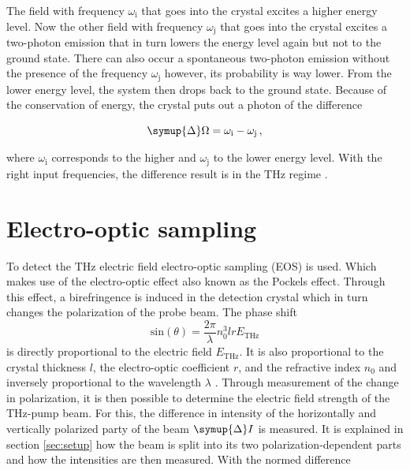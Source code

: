 The field with frequency $\omega_\text{i}$ that goes into the crystal excites a higher energy level.
Now the other field  with frequency $\omega_\text{j}$ that goes into the crystal excites a two-photon emission that in turn lowers the energy level again but not to the ground state.
There can also occur a spontaneous two-photon emission without the presence of the frequency $\omega_\text{j}$ however, its probability is way lower.
From the lower energy level, the system then drops back to the ground state.
Because of the conservation of energy, the crystal puts out a photon of the difference

\begin{equation}
    \symup{\Delta}\Omega = \omega_\text{i} - \omega_\text{j} \, ,
\end{equation}

where $\omega_\text{i}$ corresponds to the higher and $\omega_\text{j}$ to the lower energy level.
With the right input frequencies, the difference result is in the $\si{\tera\hertz}$ regime \cite{boyd2020nonlinear}.



\section{Electro-optic sampling}\label{sec:eos}
To detect the $\si{\tera\hertz}$ electric field electro-optic sampling (EOS) is used.
Which makes use of the electro-optic effect also known as the Pockels effect.
Through this effect, a birefringence is induced in the detection crystal which in turn changes the polarization of the probe beam.
The phase shift 
\begin{equation}
    \text{sin}(\theta) = \frac{2\pi}{\lambda} n_0^3 l r E_\text{THz}
\end{equation}
is directly proportional to the electric field $E_\text{THz}$. 
It is also proportional to the crystal thickness $l$, the electro-optic coefficient $r$, and the refractive index $n_0$ and inversely proportional to the wavelength $\lambda$ \cite{wiki_book}. 
Through measurement of the change in polarization, it is then possible to determine the electric field strength of the $\si{\tera\hertz}$-pump beam.
For this, the difference in intensity of the horizontally and vertically polarized party of the beam $\symup{\Delta}I$ is measured.
It is explained in section \ref{sec:setup} how the beam is split into its two polarization-dependent parts and how the intensities are then measured.
With the normed difference 

